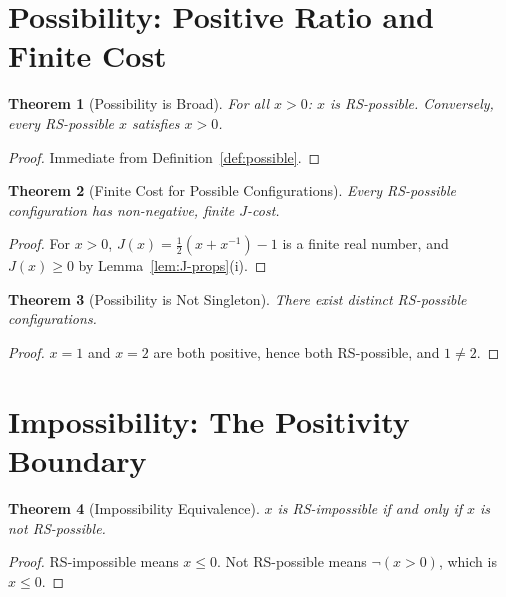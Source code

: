 \documentclass[12pt,a4paper]{article}
\newtheorem{theorem}{Theorem}[section]
\theoremstyle{definition}
\theoremstyle{remark}
\begin{document}
\section{Possibility: Positive Ratio and Finite Cost}
\label{sec:possibility}

\begin{theorem}[Possibility is Broad]
\label{thm:possible}
For all $x > 0$: $x$ is RS-possible.  Conversely, every RS-possible
$x$ satisfies $x > 0$.
\end{theorem}

\begin{proof}
Immediate from Definition~\ref{def:possible}.
\end{proof}

\begin{theorem}[Finite Cost for Possible Configurations]
\label{thm:finite-cost}
Every RS-possible configuration has non-negative, finite $J$-cost.
\end{theorem}

\begin{proof}
For $x > 0$, $J(x) = \tfrac{1}{2}(x + x^{-1}) - 1$ is a finite real
number, and $J(x) \geq 0$ by Lemma~\ref{lem:J-props}(i).
\end{proof}

\begin{theorem}[Possibility is Not Singleton]
\label{thm:not-singleton}
There exist distinct RS-possible configurations.
\end{theorem}

\begin{proof}
$x = 1$ and $x = 2$ are both positive, hence both RS-possible, and
$1 \neq 2$.
\end{proof}

\section{Impossibility: The Positivity Boundary}
\label{sec:impossible}

\begin{theorem}[Impossibility Equivalence]
\label{thm:impossible}
$x$ is RS-impossible if and only if $x$ is not RS-possible.
\end{theorem}

\begin{proof}
RS-impossible means $x \leq 0$.  Not RS-possible means $\neg(x > 0)$,
which is $x \leq 0$.
\end{proof}
\end{document}
